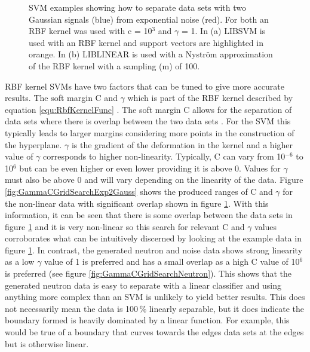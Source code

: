 \begin{figure}[!h]
\begin{subfigure}{.5\textwidth}
  \captionsetup{width=.9\linewidth}
  \caption{}
  \label{subFig:exp_2NysGaussExample}
\end{subfigure}
\caption[SVM example separating two Gaussian data sets from exponential noise.]{SVM examples showing how to separate data sets with two Gaussian signals (blue) from exponential noise (red). For both an RBF kernel was used with c = 10$^3$ and $\gamma$ = 1. In (a) LIBSVM is used with an RBF kernel and support vectors are highlighted in orange. In (b) LIBLINEAR is used with a Nyström approximation of the RBF kernel with a sampling (m) of 100.}
\label{fig:svmExp_GausseExamples}
\end{figure}

RBF kernel SVMs have two factors that can be tuned to give more accurate results. The soft margin C and $\gamma$ which is part of the RBF kernel described by equation \ref{equ:RbfKernelFunc} \cite{Boser92atraining}. The soft margin C allows for the separation of data sets where there is overlap between the two data sets \cite{cortes1995support}. For the SVM this typically leads to larger margins considering more points in the construction of the hyperplane. $\gamma$ is the gradient of the deformation in the kernel and a higher value of $\gamma$ corresponds to higher non-linearity. Typically, C can vary from 10$^{-6}$ to 10$^6$ but can be even higher or even lower providing it is above 0. Values for $\gamma$ must also be above 0 and will vary depending on the linearity of the data. Figure \ref{fig:GammaCGridSearchExp2Gauss} shows the produced ranges of C and $\gamma$ for the non-linear data with significant overlap shown in figure \ref{subFig:exp_2NysGaussExample}. With this information, it can be seen that there is some overlap between the data sets  in figure \ref{subFig:exp_2NysGaussExample} and it is very non-linear so this search for relevant C and $\gamma$ values corroborates what can be intuitively discerned by looking at the example data in figure \ref{subFig:exp_2NysGaussExample}. In contrast, the generated neutron and noise data shows strong linearity as a low $\gamma$ value of 1 is preferred and has a small overlap as a high C value of 10$^6$ is preferred (see figure \ref{fig:GammaCGridSearchNeutron}). This shows that the generated neutron data is easy to separate with a linear classifier and using anything more complex than an SVM is unlikely to yield better results. This does not necessarily mean the data is 100\,\% linearly separable, but it does indicate the boundary formed is heavily dominated by a linear function. For example, this would be true of a boundary that curves towards the edges data sets at the edges but is otherwise linear. 


